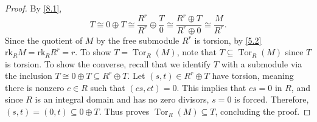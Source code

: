 \documentclass[11pt, letterpaper]{article}
\begin{document}
\begin{proof}
	By \cref{8.1},
	\[
		T \cong 0 \oplus T\cong \frac{R^r}{R^r} \oplus \frac{T}{0} \cong \frac{R^r \oplus T}{R^r\oplus 0} \cong \frac{M}{R^r} 
	.\]
	Since the quotient of $M$ by the free submodule $R^r$ is torsion, by \cref{5.2} $\mathrm{rk} _RM = \mathrm{rk} _RR^r=r$. To show $T=\operatorname{Tor} _R(M)$, note that $T\subseteq \operatorname{Tor} _R(M)$ since $T$ is torsion. To show the converse, recall that we identify $T$ with a submodule via the inclusion $T \cong 0 \oplus T \subseteq R^r\oplus T$. Let $(s,t)\in R^r\oplus T$ have torsion, meaning there is nonzero $c\in R$ such that $(cs,ct)=0$. This implies that $cs=0$ in $R$, and since $R$ is an integral domain and has no zero divisors, $s=0$ is forced. Therefore, $(s,t)=(0,t)\subseteq 0\oplus T$. Thus proves $\operatorname{Tor} _R(M) \subseteq T$, concluding the proof.
\end{proof}
\end{document}
